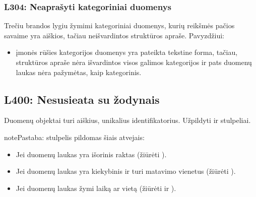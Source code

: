 \documentclass[letterpaper,10pt,lithuanian]{sphinxmanual}
\begin{document}
\subsubsection{L304: Neaprašyti kategoriniai duomenys}
\label{\detokenize{branda:l304-neaprasyti-kategoriniai-duomenys}}\label{\detokenize{branda:l304}}
\sphinxAtStartPar
Trečiu brandos lygiu žymimi kategoriniai duomenys, kurių reikšmės pačios
savaime yra aiškios, tačiau neišvardintos struktūros apraše. Pavyzdžiui:
\begin{itemize}
\item {} 
\sphinxAtStartPar
{} \sphinxhyphen{} įmonės rūšies kategorijos duomenys yra pateikta
tekstine forma, tačiau, struktūros apraše nėra išvardintos visos
galimos kategorijos ir pats duomenų laukas nėra pažymėtas, kaip
kategorinis.

\end{itemize}


\subsection{L400: Nesusieata su žodynais}
\label{\detokenize{branda:l400-nesusieata-su-zodynais}}\label{\detokenize{branda:l400}}
\sphinxAtStartPar
Duomenų objektai turi aiškius, unikalius identifikatorius. Užpildyti
{\hyperref[\detokenize{dimensijos:model.ref}]{}} ir {\hyperref[\detokenize{dimensijos:property.ref}]{}} stulpeliai.

\begin{sphinxadmonition}{note}{Pastaba:}
\sphinxAtStartPar
{\hyperref[\detokenize{dimensijos:property.ref}]{}} stulpelis pildomas šiais atvejais:
\begin{itemize}
\item {} 
\sphinxAtStartPar
Jei duomenų laukas yra išorinis raktas (žiūrėti {\hyperref[\detokenize{identifikatoriai:ref-types}]{}}).

\item {} 
\sphinxAtStartPar
Jei duomenų laukas yra kiekybinis ir turi matavimo vienetus
(žiūrėti {\hyperref[\detokenize{vienetai:matavimo-vienetai}]{}}).

\item {} 
\sphinxAtStartPar
Jei duomenų laukas žymi laiką ar vietą (žiūrėti
 ir ).

\end{itemize}
\end{sphinxadmonition}
\end{document}
